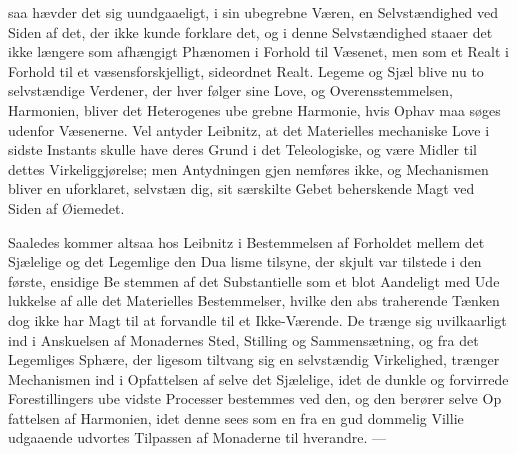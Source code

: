 \documentclass[12pt,a4paper]{book}
\begin{document}
saa hævder det sig uundgaaeligt, i sin ubegrebne Væren, en
Selvstændighed ved Siden af det, der ikke kunde forklare det, og
i denne Selvstændighed staaer det ikke længere som afhængigt
Phænomen i Forhold til Væsenet, men som et Realt i Forhold
til et væsensforskjelligt, sideordnet Realt. Legeme og Sjæl
blive nu to selvstændige Verdener, der hver følger sine Love,
og Overensstemmelsen, Harmonien, bliver det Heterogenes ube\-%
grebne Harmonie, hvis Ophav maa søges udenfor Væsenerne.
Vel antyder Leibnitz, at det Materielles mechaniske Love i
sidste Instants skulle have deres Grund i det Teleologiske, og
være Midler til dettes Virkeliggjørelse; men Antydningen gjen\-%
nemføres ikke, og Mechanismen bliver en uforklaret, selvstæn\-%
dig, sit særskilte Gebet beherskende Magt ved Siden af Øiemedet.

Saaledes kommer altsaa hos Leibnitz i Bestemmelsen af
Forholdet mellem det Sjælelige og det Legemlige den Dua\-%
lisme tilsyne, der skjult var tilstede i den første, ensidige Be\-%
stemmen af det Substantielle som et blot Aandeligt med Ude\-%
lukkelse af alle det Materielles Bestemmelser, hvilke den abs\-%
traherende Tænken dog ikke har Magt til at forvandle til et
Ikke-Værende. De trænge sig uvilkaarligt ind i Anskuelsen
af Monadernes Sted, Stilling og Sammensætning, og fra det
Legemliges Sphære, der ligesom tiltvang sig en selvstændig
Virkelighed, trænger Mechanismen ind i Opfattelsen af selve
det Sjælelige, idet de dunkle og forvirrede Forestillingers ube\-%
vidste Processer bestemmes ved den, og den berører selve Op\-%
fattelsen af Harmonien, idet denne sees som en fra en gud\-%
dommelig Villie udgaaende udvortes Tilpassen af Monaderne til
hverandre. ---
\end{document}
